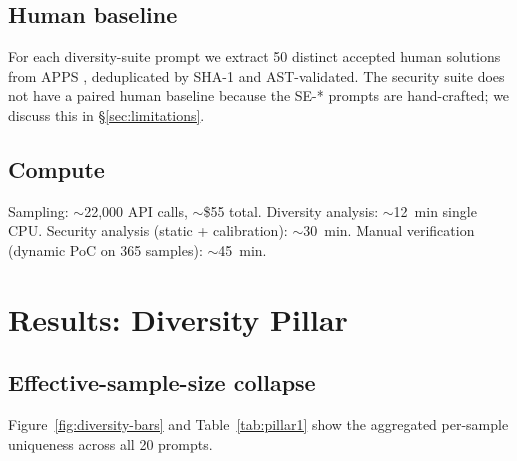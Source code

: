 \documentclass{article}
\begin{document}
\subsection{Human baseline}

For each diversity-suite prompt we extract 50 distinct accepted human
solutions from APPS \citep{hendrycks2021apps}, deduplicated by SHA-1 and
AST-validated. The security suite does not have a paired human baseline
because the SE-* prompts are hand-crafted; we discuss this in
\S\ref{sec:limitations}.

\subsection{Compute}

Sampling: $\sim$22,000 API calls, $\sim$\$55 total. Diversity analysis:
$\sim$12~min single CPU. Security analysis (static + calibration): $\sim$30~min.
Manual verification (dynamic PoC on 365 samples): $\sim$45~min.

\section{Results: Diversity Pillar}
\label{sec:results-diversity}

\subsection{Effective-sample-size collapse}

Figure~\ref{fig:diversity-bars} and Table~\ref{tab:pillar1} show the
aggregated per-sample uniqueness across all 20 prompts.
\end{document}
